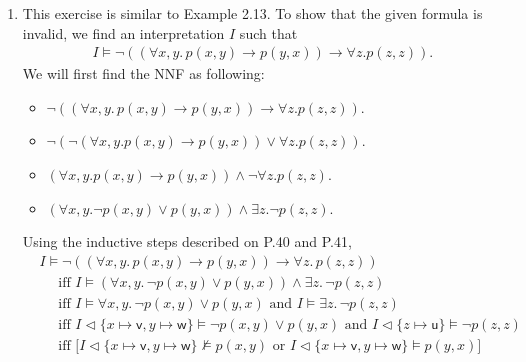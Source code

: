 \begin{exer}[2.2]
    $ $
    \begin{enumerate}[label=(\alph*)]
        \item %
            This exercise is similar to Example 2.13.
            To show that the given formula is invalid, we find an interpretation $I$ such that
            \begin{align*}
                I \models \neg((\forall x, y.\, p(x, y) \rightarrow p(y, x)) \rightarrow \forall z. p(z, z)).
            \end{align*}
            We will first find the NNF as following:
            \begin{itemize}
                \item
                    $\neg((\forall x, y.\, p(x, y) \rightarrow p(y, x)) \rightarrow \forall z. p(z, z))$.
                \item
                    $\neg(\neg(\forall x, y . p(x, y) \rightarrow p(y, x)) \lor \forall z. p(z, z))$.
                \item
                    $(\forall x, y . p(x, y) \rightarrow p(y, x)) \land \neg \forall z. p(z, z)$.
                \item
                    $(\forall x, y . \neg p(x, y) \lor p(y, x)) \land \exists z. \neg p(z, z)$.
            \end{itemize}
            Using the inductive steps described on P.40 and P.41,
            \begin{align*}
                &I \models \neg((\forall x, y.\, p(x, y) \rightarrow p(y, x)) \rightarrow \forall z.\, p(z, z)) \\
                    &\quad \text{ iff } I \models (\forall x, y.\, \neg p(x, y) \lor p(y, x)) \land \exists z.\, \neg p(z, z) \\
                    &\quad \text{ iff } I \models \forall x, y.\, \neg p(x, y) \lor p(y, x) \text{ and } I \models \exists z.\, \neg p(z, z) \\
                    &\quad \text{ iff } I \vartriangleleft \{ x \mapsto \textsf{v}, y \mapsto \textsf{w} \} \models \neg p(x, y) \lor p(y, x)
                                            \text{ and } I \vartriangleleft \{ z \mapsto \textsf{u} \} \models \neg p(z, z) \\
                    &\quad \text{ iff } \big[I \vartriangleleft \{ x \mapsto \textsf{v}, y \mapsto \textsf{w} \} \not\models p(x, y)
                                    \text{ or } I \vartriangleleft \{ x \mapsto \textsf{v}, y \mapsto \textsf{w} \} \models p(y, x)\big]  \\

\end{align*}
\end{enumerate}
\end{exer}
